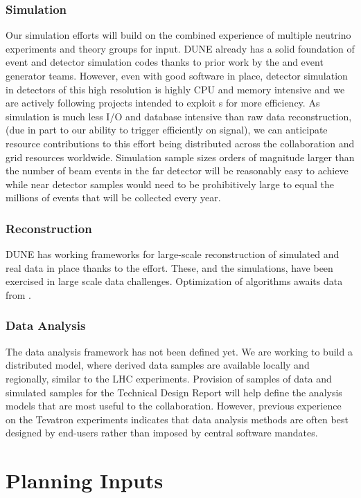 \subsubsection{Simulation}  Our simulation efforts will build on the combined experience of multiple neutrino experiments and theory groups for input.  DUNE already has a solid foundation of event and detector simulation codes thanks to prior work by the  and event generator teams.  However,   even with good software in place, detector simulation in detectors of this high resolution is highly CPU and memory intensive and we are actively following projects intended to exploit s for more efficiency.  As simulation is much less I/O and database intensive than raw data reconstruction, (due in part to our ability to trigger efficiently on signal), we can anticipate resource contributions to this effort being distributed across the collaboration and grid resources worldwide. Simulation sample sizes orders of magnitude larger than the number of beam events  in the  far detector will be reasonably easy to achieve while near detector samples would need to be prohibitively large to equal the millions of events that will be collected every year. 

\subsubsection{Reconstruction} DUNE has working frameworks for large-scale reconstruction of simulated and real data in place thanks to the  effort.  These, and the simulations, have been exercised in large scale data challenges. Optimization of algorithms awaits data from . 
 
 \subsubsection{Data Analysis}
 The  data analysis framework has not been defined yet.  We are working to build a distributed model, where derived data samples are available locally and regionally, similar to the LHC experiments.   Provision of samples  of  data and simulated samples for the Technical Design Report will help define the analysis models that are most useful to the collaboration. However,  previous experience on the Tevatron experiments indicates that data analysis methods are often best designed by end-users rather than imposed by central software mandates. 
 
 
\section{Planning Inputs}


